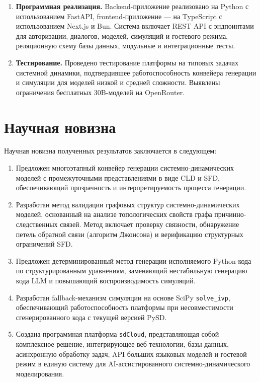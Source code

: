 \begin{enumerate}
    \item \textbf{Программная реализация.} Backend-приложение реализовано на Python с использованием FastAPI, frontend-приложение --- на TypeScript с использованием Next.js и Bun. Система включает REST API с эндпоинтами для авторизации, диалогов, моделей, симуляций и гостевого режима, реляционную схему базы данных, модульные и интеграционные тесты.

    \item \textbf{Тестирование.} Проведено тестирование платформы на типовых задачах системной динамики, подтвердившее работоспособность конвейера генерации и симуляции для моделей низкой и средней сложности. Выявлены ограничения бесплатных 30B-моделей на OpenRouter.
\end{enumerate}

\section*{Научная новизна}

Научная новизна полученных результатов заключается в следующем:

\begin{enumerate}
    \item Предложен многоэтапный конвейер генерации системно-динамических моделей с промежуточными представлениями в виде CLD и SFD, обеспечивающий прозрачность и интерпретируемость процесса генерации.

    \item Разработан метод валидации графовых структур системно-динамических моделей, основанный на анализе топологических свойств графа причинно-следственных связей. Метод включает проверку связности, обнаружение петель обратной связи (алгоритм Джонсона) и верификацию структурных ограничений SFD.

    \item Предложен детерминированный метод генерации исполняемого Python-кода по структурированным уравнениям, заменяющий нестабильную генерацию кода LLM и повышающий воспроизводимость симуляций.

    \item Разработан fallback-механизм симуляции на основе SciPy \texttt{solve\_ivp}, обеспечивающий работоспособность платформы при несовместимости сгенерированного кода с текущей версией PySD.

    \item Создана программная платформа \texttt{sdCloud}, представляющая собой комплексное решение, интегрирующее веб-технологии, базы данных, асинхронную обработку задач, API больших языковых моделей и гостевой режим в единую систему для AI-ассистированного системно-динамического моделирования.
\end{enumerate}

